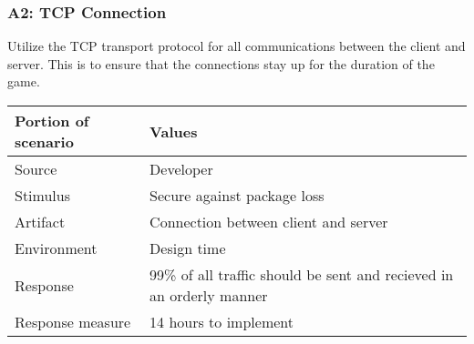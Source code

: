 \subsubsection*{A2: TCP Connection}
Utilize the TCP transport protocol for all communications between the client
and server. This is to ensure that the connections stay up for the duration
of the game.

\begin{tabular}{|m{}|m{}|}
\hline
{\bf Portion of scenario} & {\bf Values} \\ \hline
Source & Developer \\ \hline
Stimulus & Secure against package loss \\ \hline
Artifact & Connection between client and server \\ \hline
Environment & Design time \\ \hline
Response & 99\% of all traffic should be sent and recieved in an orderly manner \\ \hline
Response measure & 14 hours to implement \\ \hline
\end{tabular}
